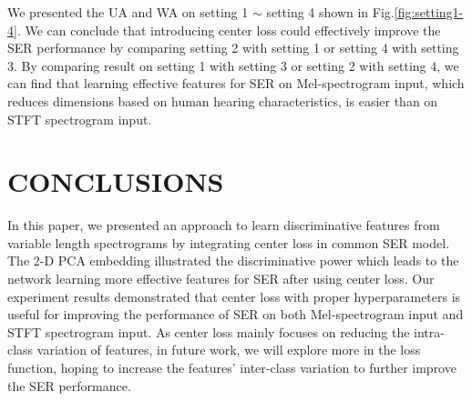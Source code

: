 \documentclass{article}
\begin{document}
We presented the UA and WA on setting 1 $\sim$ setting 4 shown in Fig.\ref{fig:setting1-4}. We can conclude that introducing center loss could effectively improve the SER performance by comparing setting 2 with setting 1 or setting 4 with setting 3.  By comparing result on setting 1 with setting 3 or setting 2 with setting 4, we can find that learning effective features for SER on Mel-spectrogram input, which reduces dimensions based on human hearing characteristics, is easier than on STFT spectrogram input.

\section{CONCLUSIONS}
In this paper, we presented an approach to learn discriminative features from variable length spectrograms by integrating center loss in common SER model. The 2-D PCA embedding illustrated the discriminative power which leads to the network learning more effective features for SER after using center loss. Our experiment results demonstrated that center loss with proper hyperparameters is useful for improving the performance of SER on both Mel-spectrogram input and STFT spectrogram input. As center loss mainly focuses on reducing the intra-class variation of features, in future work, we will explore more in the loss function, hoping to increase the features' inter-class variation to further improve the SER performance. 

\vfill\pagebreak
								




\end{document}
